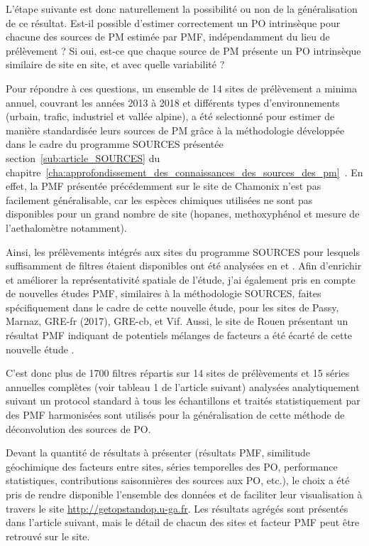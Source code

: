 L'étape suivante est donc naturellement la possibilité ou non de la généralisation de ce
résultat.  Est-il possible d'estimer correctement un PO intrinsèque pour chacune des
sources de PM estimée par PMF, indépendamment du lieu de prélèvement ? Si oui, est-ce que
chaque source de PM présente un PO intrinsèque similaire de site en site, et avec quelle
variabilité ?

Pour répondre à ces questions, un ensemble de 14 sites de prélèvement a minima annuel,
couvrant les années 2013 à 2018 et différents types d'environnements (urbain, trafic,
industriel et vallée alpine),
a été selectionné pour estimer de manière standardisée leurs sources de PM grâce à la
méthodologie développée dans le cadre du programme SOURCES présentée
section~\ref{sub:article_SOURCES} du
chapitre~\ref{cha:approfondissement_des_connaissances_des_sources_des_pm}~\autocite{weberSources2019}.
En effet, la PMF présentée précédemment sur le site de
Chamonix n'est pas facilement généralisable, car les espèces chimiques utilisées ne sont
pas disponibles pour un grand nombre de site (hopanes, methoxyphénol et mesure de
l'aethalomètre notamment).

Ainsi, les prélèvements intégrés aux sites du programme SOURCES pour lesquels suffisamment de filtres étaient
disponibles ont été analysées en \POAA{} et \PODTT. Afin d'enrichir et améliorer la
représentativité spatiale de l'étude, j'ai également pris en compte de nouvelles études
PMF, similaires à la méthodologie SOURCES, faites spécifiquement dans le cadre de cette
nouvelle étude, pour les sites de Passy, Marnaz, GRE-fr (2017), GRE-cb, et Vif.
Aussi, le site de Rouen présentant un résultat PMF indiquant de potentiels mélanges de
facteurs a été écarté de cette nouvelle étude \autocite{weberComparison2019}.

C'est donc plus de 1700 filtres répartis sur 14 sites de prélèvements et 15 séries
annuelles complètes (voir tableau 1 de l'article suivant) analysées analytiquement suivant
un protocol standard à tous les échantillons et traités statistiquement par des PMF
harmonisées sont utilisés pour la généralisation de cette méthode de déconvolution des
sources de PO.

\begin{tcolorbox}[colback=red!5!white,colframe=Melon,title=Note]
    Devant la quantité de résultats à présenter (résultats PMF, similitude géochimique des
    facteurs entre sites, séries temporelles des PO, performance statistiques,
    contributions saisonnières des sources aux PO, etc.), le choix a été pris de rendre
    disponible l'ensemble des données et de faciliter leur visualisation à travers le site
    \url{http://getopstandop.u-ga.fr}.
    Les résultats agrégés sont présentés dans l'article suivant, mais le détail de chacun
    des sites et facteur PMF peut être retrouvé sur le site.
\end{tcolorbox}

